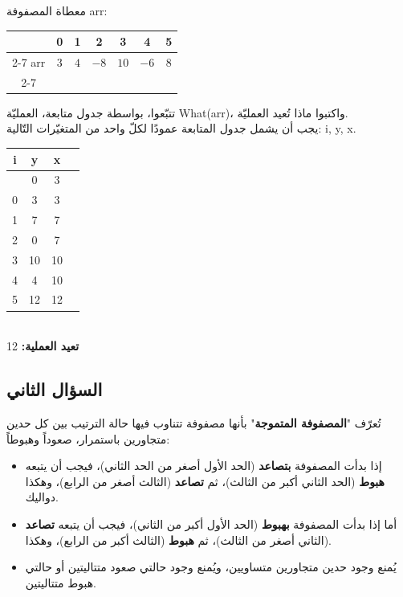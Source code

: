 \documentclass[14pt]{extarticle}
\begin{document}
معطاة المصفوفة \textenglish{arr}:

{\small
\begin{english}
\begin{center}
\renewcommand{\arraystretch}{1.5}
\setlength{\tabcolsep}{12pt}
\begin{tabular}{c | c | c | c | c | c | c |}
\multicolumn{1}{c}{} & \multicolumn{1}{c}{0} & \multicolumn{1}{c}{1} & \multicolumn{1}{c}{2} & \multicolumn{1}{c}{3} & \multicolumn{1}{c}{4} & \multicolumn{1}{c}{5} \\
\cline{2-7}
\textenglish{arr} & $3$ & $4$ & $-8$ & $10$ & $-6$ & $8$ \\
\cline{2-7}
\end{tabular}
\end{center}
\end{english}
}

تتبّعوا، بواسطة جدول متابعة، العمليّة \textenglish{What(arr)}، واكتبوا ماذا تُعيد العمليّة. \\
يجب أن يشمل جدول المتابعة عمودًا لكلّ واحد من المتغيّرات التّالية: \textenglish{i, y, x}.

\ifwithsols
\begin{boxSolution}
\renewcommand{\arraystretch}{1.2}
\begin{tabular}{|c|c|c|c|}
\hline
\textenglish{i} & \textenglish{y} & \textenglish{x} \\
\hline
 & 0 & 3 \\
\hline
0 & 3 & 3 \\
\hline
1 & 7 & 7 \\
\hline
2 & 0 & 7 \\
\hline
3 & 10 & 10 \\
\hline
4 & 4 & 10 \\
\hline
5 & 12 & 12 \\
\hline
\end{tabular}
\vspace{1em} \\
\textbf{تعيد العملية:} \textenglish{12}
\end{boxSolution}
\fi

\clearpage
\subsection*{السؤال الثاني}
تُعرّف "\textbf{المصفوفة المتموجة}" بأنها مصفوفة تتناوب فيها حالة الترتيب بين كل حدين متجاورين باستمرار، صعوداً وهبوطاً:
\begin{itemize}
  \item إذا بدأت المصفوفة \textbf{بتصاعد} (الحد الأول أصغر من الحد الثاني)، فيجب أن يتبعه \textbf{هبوط} (الحد الثاني أكبر من الثالث)، ثم \textbf{تصاعد} (الثالث أصغر من الرابع)، وهكذا دواليك.
  \item أما إذا بدأت المصفوفة \textbf{بهبوط} (الحد الأول أكبر من الثاني)، فيجب أن يتبعه \textbf{تصاعد} (الثاني أصغر من الثالث)، ثم \textbf{هبوط} (الثالث أكبر من الرابع)، وهكذا.
  \item يُمنع وجود حدين متجاورين متساويين، ويُمنع وجود حالتي صعود متتاليتين أو حالتي هبوط متتاليتين.
\end{itemize}
\end{document}
